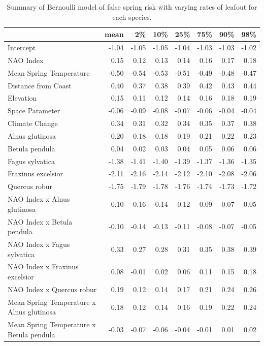 \documentclass{article}\usepackage[]{graphicx}\usepackage[]{color}
\begin{document}
\begin{longtable}{lrrrrrrr}
\caption{Summary of Bernoulli model of false spring risk with varying rates of leafout for each species.} \\ 
  \hline
 & mean & 2\% & 10\% & 25\% & 75\% & 90\% & 98\% \\ 
  \hline \endhead  \hline
Intercept & -1.04 & -1.05 & -1.05 & -1.04 & -1.03 & -1.03 & -1.02 \\ 
  NAO Index & 0.15 & 0.12 & 0.13 & 0.14 & 0.16 & 0.17 & 0.18 \\ 
  Mean Spring 
Temperature & -0.50 & -0.54 & -0.53 & -0.51 & -0.49 & -0.48 & -0.47 \\ 
  Distance from 
Coast & 0.40 & 0.37 & 0.38 & 0.39 & 0.42 & 0.43 & 0.44 \\ 
  Elevation & 0.15 & 0.11 & 0.12 & 0.14 & 0.16 & 0.18 & 0.19 \\ 
  Space Parameter & -0.06 & -0.09 & -0.08 & -0.07 & -0.06 & -0.04 & -0.04 \\ 
  Climate Change & 0.34 & 0.31 & 0.32 & 0.34 & 0.35 & 0.37 & 0.38 \\ 
  Alnus glutinosa & 0.20 & 0.18 & 0.18 & 0.19 & 0.21 & 0.22 & 0.23 \\ 
  Betula pendula & 0.04 & 0.02 & 0.03 & 0.04 & 0.05 & 0.06 & 0.06 \\ 
  Fagus sylvatica & -1.38 & -1.41 & -1.40 & -1.39 & -1.37 & -1.36 & -1.35 \\ 
  Fraxinus excelsior & -2.11 & -2.16 & -2.14 & -2.12 & -2.10 & -2.08 & -2.06 \\ 
  Quercus robur & -1.75 & -1.79 & -1.78 & -1.76 & -1.74 & -1.73 & -1.72 \\ 
  NAO Index
x Alnus glutinosa & -0.10 & -0.16 & -0.14 & -0.12 & -0.09 & -0.07 & -0.05 \\ 
  NAO Index
x Betula pendula & -0.10 & -0.14 & -0.13 & -0.11 & -0.08 & -0.07 & -0.05 \\ 
  NAO Index
x Fagus sylvatica & 0.33 & 0.27 & 0.28 & 0.31 & 0.35 & 0.38 & 0.39 \\ 
  NAO Index
x Fraxinus excelsior & 0.08 & -0.01 & 0.02 & 0.06 & 0.11 & 0.15 & 0.18 \\ 
  NAO Index
x Quercus robur & 0.19 & 0.12 & 0.14 & 0.17 & 0.21 & 0.24 & 0.26 \\ 
  Mean Spring 
Temperature
x Alnus glutinosa & 0.18 & 0.12 & 0.14 & 0.16 & 0.19 & 0.22 & 0.24 \\ 
  Mean Spring 
Temperature
x Betula pendula & -0.03 & -0.07 & -0.06 & -0.04 & -0.01 & 0.01 & 0.02 \\ 

\end{longtable}
\end{document}
